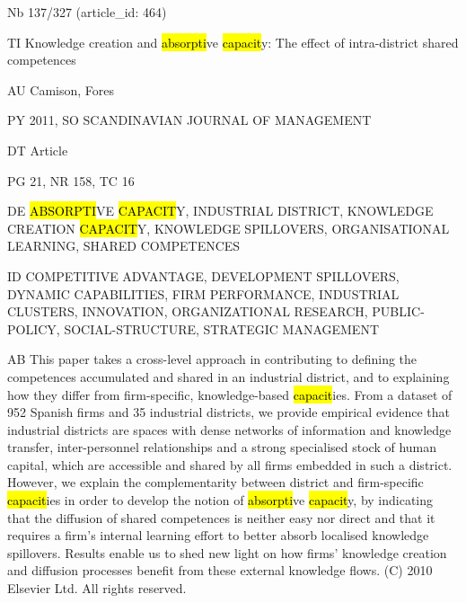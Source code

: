 \documentclass[a4paper]{article}
\begin{document}
\vspace*{-2cm}
Nb \tabto{0cm}137/327 (article\_id: 464)\par
TI \tabto{0cm}Knowledge creation and \hl{absorpti}ve \hl{capacit}y: The effect of intra-district shared competences\par
AU \tabto{0cm}Camison, Fores\par
PY \tabto{0cm}2011, SO SCANDINAVIAN JOURNAL OF MANAGEMENT\par
DT \tabto{0cm}Article\par
PG \tabto{0cm}21, NR 158, TC 16\par
DE \tabto{0cm}\hl{ABSORPTI}VE \hl{CAPACIT}Y, INDUSTRIAL DISTRICT, KNOWLEDGE CREATION \hl{CAPACIT}Y, KNOWLEDGE SPILLOVERS, ORGANISATIONAL LEARNING, SHARED COMPETENCES\par
ID \tabto{0cm}COMPETITIVE ADVANTAGE, DEVELOPMENT SPILLOVERS, DYNAMIC CAPABILITIES, FIRM PERFORMANCE, INDUSTRIAL CLUSTERS, INNOVATION, ORGANIZATIONAL RESEARCH, PUBLIC-POLICY, SOCIAL-STRUCTURE, STRATEGIC MANAGEMENT\par
AB \tabto{0cm}This paper takes a cross-level approach in contributing to defining the competences accumulated and shared in an industrial district, and to explaining how they differ from firm-specific, knowledge-based \hl{capacit}ies. From a dataset of 952 Spanish firms and 35 industrial districts, we provide empirical evidence that industrial districts are spaces with dense networks of information and knowledge transfer, inter-personnel relationships and a strong specialised stock of human capital, which are accessible and shared by all firms embedded in such a district. However, we explain the complementarity between district and firm-specific \hl{capacit}ies in order to develop the notion of \hl{absorpti}ve \hl{capacit}y, by indicating that the diffusion of shared competences is neither easy nor direct and that it requires a firm's internal learning effort to better absorb localised knowledge spillovers. Results enable us to shed new light on how firms' knowledge creation and diffusion processes benefit from these external knowledge flows. (C) 2010 Elsevier Ltd. All rights reserved.\par
\clearpage
\end{document}
